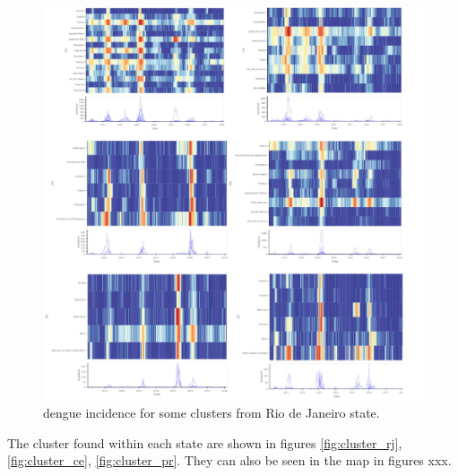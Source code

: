 \documentclass[12pt]{report}
\begin{document}
\begin{figure}[h!]
 \centering
 \includegraphics[scale=0.8]{./clusters_rj_holo.pdf}
 \caption{dengue incidence for some clusters from Rio de Janeiro state.}
 \label{fig:cluster_cf}
\end{figure}


The cluster found within each state are shown in figures \ref{fig:cluster_rj}, \ref{fig:cluster_ce}, \ref{fig:cluster_pr}. They can also be seen in the map in figures xxx.
\end{document}
